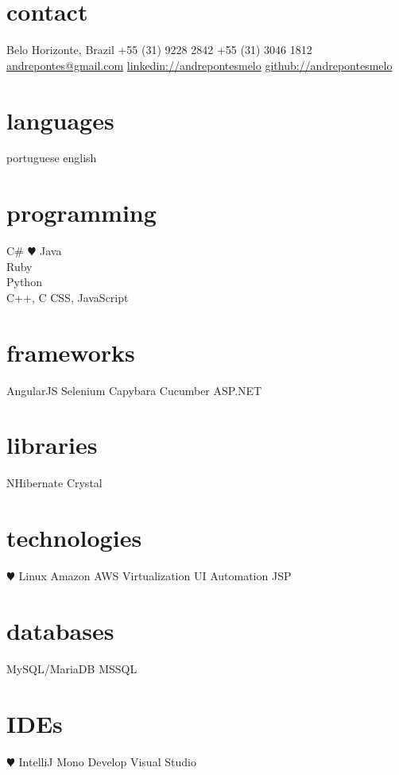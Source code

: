 \documentclass[]{friggeri-cv}
\begin{document}


\begin{aside} 
\section{contact}
Belo Horizonte, Brazil
+55 (31) 9228 2842
+55 (31) 3046 1812
~
\href{mailto:andrepontes@gmail.com}{andrepontes@gmail.com}
\href{https://br.linkedin.com/in/andrepontesmelo}{linkedin://andrepontesmelo}
\href{https://github.com/andrepontesmelo}{github://andrepontesmelo}
\section{languages}
portuguese
english
\section{programming}
C\#
 {\color{red} $\varheartsuit$} Java\\Ruby\\Python\\C++, C
CSS, JavaScript
\section{frameworks}
AngularJS
Selenium
Capybara
Cucumber 
ASP.NET
\section{libraries}
NHibernate
Crystal
\section{technologies}
 {\color{red} $\varheartsuit$} Linux
Amazon AWS
Virtualization
UI Automation
JSP
\section{databases}
MySQL/MariaDB
MSSQL
\section{IDEs}
 {\color{red} $\varheartsuit$} IntelliJ
Mono Develop
Visual Studio
\end{aside}
\end{document}
